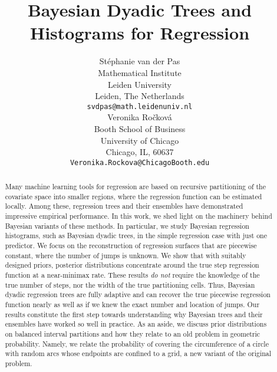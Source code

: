 \documentclass{article}
\title{Bayesian Dyadic Trees and Histograms for  Regression}
\author{
  St\'{e}phanie van der Pas  \\
  Mathematical Institute \\
  Leiden University\\
  Leiden, The Netherlands \\
  \texttt{svdpas@math.leidenuniv.nl} \\
  \And
    Veronika Ro\v{c}kov\'{a} \\
 Booth School of Business\\
  University of Chicago\\
  Chicago, IL, 60637 \\
  \texttt{Veronika.Rockova@ChicagoBooth.edu} \\
  }
\newcommand{\1}{\mathbb{I}}
\theoremstyle{assumption}
\begin{document}
\maketitle

\begin{abstract} %

  {Many machine learning  tools for regression are based on recursive partitioning of the covariate space into smaller regions, where the regression function can be estimated locally. Among these, regression trees and their ensembles have demonstrated impressive empirical performance.  
 In this work,  we shed light on the machinery behind Bayesian variants of these methods.  In particular, we study Bayesian regression histograms, such as Bayesian dyadic trees, in the simple regression case with just one predictor.   We focus on the reconstruction of regression surfaces that are piecewise constant, where the number of jumps is unknown. We show that with suitably designed priors, posterior distributions concentrate around the true step regression function at a near-minimax rate. These results {\sl do not} require the knowledge of the true number of steps, nor the width of the true partitioning cells. Thus, Bayesian dyadic regression trees are fully adaptive and can recover the true piecewise regression function nearly as well as if we knew the exact number and location  of jumps.
 Our results constitute the first step towards  understanding why Bayesian trees and their ensembles have worked so well in practice.  As an aside, we discuss prior distributions  on balanced interval partitions and how they relate to an old  problem in geometric probability. Namely, we relate the probability of covering the circumference of a circle with random arcs whose endpoints are confined to a grid, a new variant of the original problem.
   }
  \end{abstract}
\vspace{-0.5cm}
\end{document}
